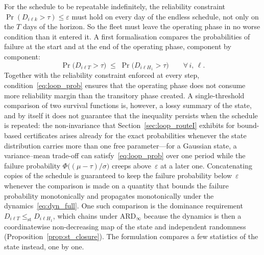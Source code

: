 \documentclass[11pt,a4paper]{article}
\theoremstyle{plain}
\theoremstyle{definition}
\theoremstyle{remark}
\begin{document}
For the schedule to be repeatable indefinitely, the reliability constraint $\Pr(D_{i\ell k} > \tau) \le \varepsilon$ must hold on every day of the endless schedule, not only on the $T$ days of the horizon.
So the fleet must leave the operating phase in no worse condition than it entered it.
A first formalisation compares the probabilities of failure at the start and at the end of the operating phase, component by component:
\begin{equation}\label{eq:loop_prob}
  \Pr\!\bigl(D_{i\ell T} > \tau\bigr)
  \;\le\;
  \Pr\!\bigl(D_{i\ell H_1} > \tau\bigr)
  \qquad \forall\, i,\,\ell.
\end{equation}
Together with the reliability constraint enforced at every step, condition~\eqref{eq:loop_prob} ensures that the operating phase does not consume more reliability margin than the transitory phase created.
A single-threshold comparison of two survival functions is, however, a lossy summary of the state, and by itself it does not guarantee that the inequality persists when the schedule is repeated: the non-invariance that Section~\ref{sec:loop_routeI} exhibits for bound-based certificates arises already for the exact probabilities whenever the state distribution carries more than one free parameter---for a Gaussian state, a variance--mean trade-off can satisfy~\eqref{eq:loop_prob} over one period while the failure probability $\Phi\bigl((\mu-\tau)/\sigma\bigr)$ creeps above~$\varepsilon$ at a later one.
Concatenating copies of the schedule is guaranteed to keep the failure probability below~$\varepsilon$ whenever the comparison is made on a quantity that bounds the failure probability monotonically and propagates monotonically under the dynamics~\eqref{eq:dyn_full}.
One such comparison is the dominance requirement $D_{i\ell T} \le_{\mathrm{st}} D_{i\ell H_1}$, which chains under $\text{ARD}_\infty$ because the dynamics is then a coordinatewise non-decreasing map of the state and independent randomness (Proposition~\ref{prop:st_closure}).
The formulation compares a few statistics of the state instead, one by one.
\end{document}
